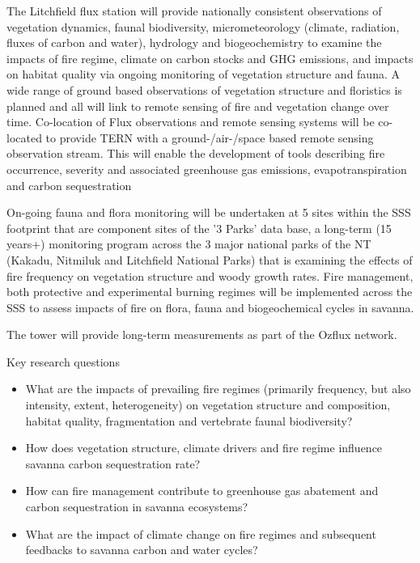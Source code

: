 \documentclass[11pt,a4paper]{article}
\begin{document}
The Litchfield flux station will provide nationally consistent observations of vegetation dynamics, faunal biodiversity, micrometeorology (climate,
            radiation, fluxes of carbon and water), hydrology and biogeochemistry to examine the impacts of fire regime, climate on carbon stocks
            and GHG emissions, and impacts on habitat quality via ongoing monitoring of vegetation structure and fauna. A wide range of ground based
            observations of vegetation structure and floristics is planned and all will link to remote sensing of fire and vegetation change over time.
            Co-location of Flux observations and remote sensing systems will be co-located to provide TERN with a ground-/air-/space based remote
            sensing observation stream. This will enable the development of tools describing fire occurrence, severity and associated greenhouse
            gas emissions, evapotranspiration and carbon sequestration

On-going fauna and flora monitoring will be undertaken at 5 sites within the SSS footprint that are component sites of the '3 Parks'
            data base, a long-term (15 years+) monitoring program across the 3 major national parks of the NT (Kakadu, Nitmiluk and Litchfield
            National Parks) that is examining the effects of fire frequency on vegetation structure and woody growth rates. Fire management,
            both protective and experimental burning regimes will be implemented across the SSS to assess impacts of fire on flora, fauna and
            biogeochemical cycles in savanna.

The tower will provide long-term measurements as part of the Ozflux network.

Key research questions

\begin{itemize}
  \item What are the impacts of prevailing fire regimes (primarily frequency, but also intensity, extent, heterogeneity) on vegetation
                structure and composition, habitat quality, fragmentation and vertebrate faunal biodiversity?
  \item How does vegetation structure, climate drivers and fire regime influence savanna carbon sequestration rate?
  \item How can fire management contribute to greenhouse gas abatement and carbon sequestration in savanna ecosystems?
  \item What are the impact of climate change on fire regimes and subsequent feedbacks to savanna carbon and water cycles?
\end{itemize}
\end{document}
